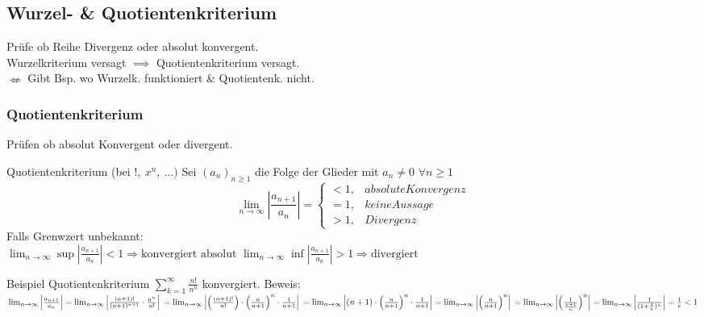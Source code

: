 \documentclass[a4paper]{article}
\def\limn{\lim_{n\to \infty}}
\begin{document}
\subsection{Wurzel- \& Quotientenkriterium}
Prüfe ob Reihe Divergenz oder absolut konvergent. \\
Wurzelkriterium versagt $\implies$ Quotientenkriterium versagt. \\
$\nLeftarrow$ Gibt Bsp. wo Wurzelk. funktioniert \& Quotientenk. nicht.

\subsubsection{Quotientenkriterium}
Prüfen ob absolut Konvergent oder divergent. \\
\begin{mainbox}{Quotientenkriterium (bei $!, \ x^n, \ ...)$}
  Sei $(a_n)_{n \geqslant 1}$ die Folge der Glieder mit $a_n \neq 0$ $\forall n \geqslant 1$
  \begin{equation*}
    \limn \left| \frac{a_{n + 1}}{a_n} \right| =
    \begin{cases}
      < 1, & absolute Konvergenz \\
      = 1, & keine Aussage       \\
      > 1, & Divergenz
    \end{cases}
  \end{equation*}
  \tiny \color{gray}
    Falls Grenwzert unbekannt: \\
    $\limn \sup \left| \frac{a_{n + 1}}{a_n} \right| < 1 \Rightarrow \text{konvergiert absolut}$ \qquad
    $\limn \inf \left| \frac{a_{n + 1}}{a_n} \right| > 1 \Rightarrow \text{divergiert}$ \\
  \normalsize \color{black}
\end{mainbox}

\begin{bspbox}{Beispiel Quotientenkriterium}
  $\sum_{k=1}^{\infty} \frac{n!}{n^n}$ konvergiert. Beweis: \\
  $\limn \left| \frac{a_{n + 1}}{a_n} \right| 
  = \limn \left| \frac{(n+1)!}{(n+1)^{n+1}} \cdot \frac{n^n}{n!} \right| \\
  = \limn \left| \left(\frac{(n+1)!}{n!}\right) \cdot \left(\frac{n}{n+1}\right)^n \cdot \frac{1}{n+1}\right| \\
  = \limn \left| (n+1) \cdot \left(\frac{n}{n+1}\right)^n \cdot \frac{1}{n+1}\right| 
  = \limn \left| \left(\frac{n}{n+1}\right)^n \right| \\
  = \limn \left| \left(\frac{1}{\frac{n+1}{n}} \right)^n \right|
  = \limn \left| \frac{1}{(1 + \frac{1}{n})^n} \right| 
  = \frac{1}{e} < 1$ \\
\end{bspbox}
\end{document}
